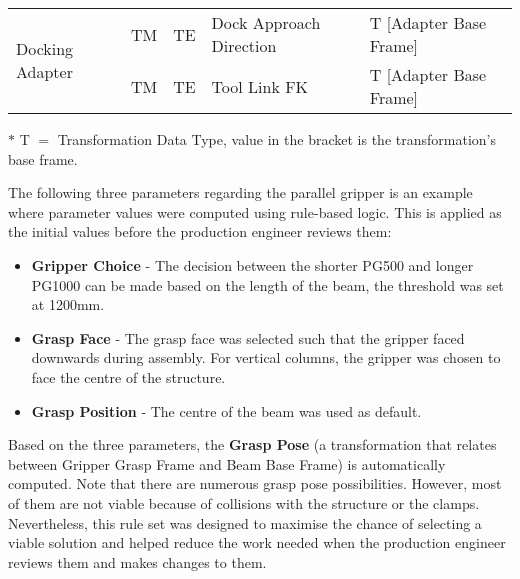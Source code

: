 \begin{table}[H]
\begin{adjustbox}{max width=\textwidth}
\begin{tabular}{p{2.09cm}p{1.51cm}p{1.93cm}p{5.92cm}p{4.48cm}}
\hline
\multicolumn{1}{|p{2.09cm}}{\multirow{2}{*}{\parbox{2.09cm}{{\footnotesize Docking Adapter}}}} & 
\multicolumn{1}{|p{1.51cm}}{{\footnotesize TM}} & 
\multicolumn{1}{|p{1.93cm}}{{\footnotesize TE}} & 
\multicolumn{1}{|p{5.92cm}}{{\footnotesize Dock Approach Direction}} & 
\multicolumn{1}{|p{4.48cm}|}{{\footnotesize T [Adapter Base Frame]}} \\ 
\hhline{~----}
\multicolumn{1}{|p{2.09cm}}{} & 
\multicolumn{1}{|p{1.51cm}}{{\footnotesize TM}} & 
\multicolumn{1}{|p{1.93cm}}{{\footnotesize TE}} & 
\multicolumn{1}{|p{5.92cm}}{{\footnotesize Tool Link FK }} & 
\multicolumn{1}{|p{4.48cm}|}{{\footnotesize T [Adapter Base Frame]}} \\ 
\hline
\end{tabular}
\end{adjustbox}
\end{table}
\vspace{24\baselineskip}
{\scriptsize $\ast$ T $=$ Transformation Data Type, value in the bracket is the transformation’s base frame.}

The following three parameters regarding the parallel gripper is an example where parameter values were computed using rule-based logic. This is applied as the initial values before the production engineer reviews them:

\begin{itemize}
	\item \textbf{Gripper Choice }- The decision between the shorter PG500 and longer PG1000 can be made based on the length of the beam, the threshold was set at 1200mm.

	\item \textbf{Grasp Face} - The grasp face was selected such that the gripper faced downwards during assembly. For vertical columns, the gripper was chosen to face the centre of the structure.

	\item \textbf{Grasp Position} - The centre of the beam was used as default. 

\end{itemize}
Based on the three parameters, the \textbf{Grasp Pose} (a transformation that relates between Gripper Grasp Frame and Beam Base Frame) is automatically computed. Note that there are numerous grasp pose possibilities. However, most of them are not viable because of collisions with the structure or the clamps. Nevertheless, this rule set was designed to maximise the chance of selecting a viable solution and helped reduce the work needed when the production engineer reviews them and makes changes to them. 

